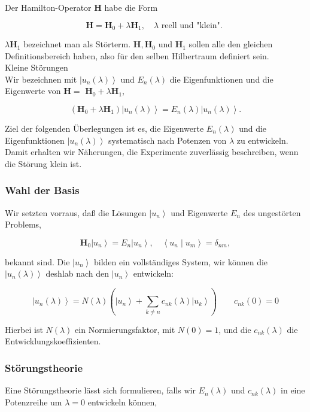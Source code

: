 \documentclass[10pt, letterpaper]{article}
\begin{document}
Der Hamilton-Operator $\mathbf{H}$ habe die Form

$$
\mathbf{H}=\mathbf{H}_{0}+\lambda \mathbf{H}_{1}, \quad \lambda \text { reell und "klein". }
$$

$\lambda \mathbf{H}_{1}$ bezeichnet man als Störterm. $\mathbf{H}, \mathbf{H}_{0}$ und $\mathbf{H}_{1}$ sollen alle den gleichen Definitionsbereich haben, also für den selben Hilbertraum definiert sein.\\
Kleine Störungen\\
Wir bezeichnen mit $\left|u_{n}(\lambda)\right\rangle$ und $E_{n}(\lambda)$ die Eigenfunktionen und die Eigenwerte von $\mathbf{H}=$ $\mathbf{H}_{0}+\lambda \mathbf{H}_{1}$,

$$
\left(\mathbf{H}_{0}+\lambda \mathbf{H}_{1}\right)\left|u_{n}(\lambda)\right\rangle=E_{n}(\lambda)\left|u_{n}(\lambda)\right\rangle .
$$

Ziel der folgenden Überlegungen ist es, die Eigenwerte $E_{n}(\lambda)$ und die Eigenfunktionen $\left|u_{n}(\lambda)\right\rangle$ systematisch nach Potenzen von $\lambda$ zu entwickeln. Damit erhalten wir Näherungen, die Experimente zuverlässig beschreiben, wenn die Störung klein ist.

\subsubsection*{Wahl der Basis}
Wir setzten vorraus, daß die Lösungen $\left|u_{n}\right\rangle$ und Eigenwerte $E_{n}$ des ungestörten Problems,

$$
\mathbf{H}_{0}\left|u_{n}\right\rangle=E_{n}\left|u_{n}\right\rangle, \quad\left\langle u_{n} \mid u_{m}\right\rangle=\delta_{n m},
$$

bekannt sind. Die $\left|u_{n}\right\rangle$ bilden ein vollständiges System, wir können die $\left|u_{n}(\lambda)\right\rangle$ deshlab nach den $\left|u_{n}\right\rangle$ entwickeln:

$$
\left|u_{n}(\lambda)\right\rangle=N(\lambda)\left(\left|u_{n}\right\rangle+\sum_{k \neq n} c_{n k}(\lambda)\left|u_{k}\right\rangle\right) \quad \quad c_{n k}(0)=0
$$

Hierbei ist $N(\lambda)$ ein Normierungsfaktor, mit $N(0)=1$, und die $c_{n k}(\lambda)$ die Entwicklungskoeffizienten.

\subsubsection*{Störungstheorie}
Eine Störungstheorie lässt sich formulieren, falls wir $E_{n}(\lambda)$ und $c_{n k}(\lambda)$ in eine Potenzreihe um $\lambda=0$ entwickeln können,
\end{document}

